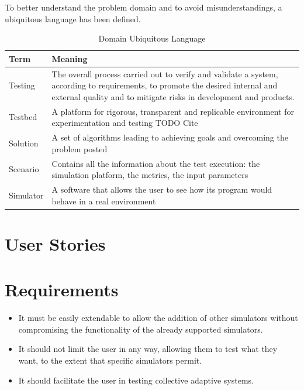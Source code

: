 \documentclass[12pt,a4paper,openright,twoside]{book}
\begin{document}
To better understand the problem domain and to avoid misunderstandings, a ubiquitous language has been defined.

\begin{table}[h]
    \centering
    \begin{tabular}{|l|p{}|}
    \toprule
    \textbf{Term} & \textbf{Meaning} \\
    \midrule                                                                                                                                                              
    Testing & The overall process carried out to verify and validate a system, according to requirements, to promote the desired internal and external quality and to mitigate risks in development and products. \\ \hline
    Testbed & A platform for rigorous, transparent and replicable environment for experimentation and testing TODO Cite \\ \hline
    Solution & A set of algorithms leading to achieving goals and overcoming the problem posted \\ \hline
    Scenario & Contains all the information about the test execution: the simulation platform, the metrics, the input parameters \\ \hline
    Simulator & A software that allows the user to see how its program would behave in a real environment \\ \hline
    \end{tabular}
    \caption{Domain Ubiquitous Language}
    \end{table}

\section{User Stories}

\section{Requirements}

\begin{itemize}
  \item It must be easily extendable to allow the addition of other simulators without compromising the functionality of the already supported simulators.
  \item It should not limit the user in any way, allowing them to test what they want, to the extent that specific simulators permit.
  \item It should facilitate the user in testing collective adaptive systems.
\end{itemize}
\end{document}
